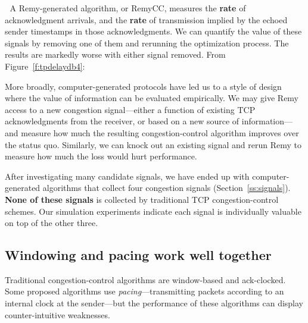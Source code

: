 \vspace{0.85 \baselineskip}
\enlargethispage{\baselineskip}

\noindent \begin{minipage}{\textwidth}

\textcolor{white}{.}\hspace{\parindent} A Remy-generated algorithm, or
RemyCC, measures the \textbf{rate} of acknowledgment arrivals, and the
\textbf{rate} of transmission implied by the echoed sender timestamps
in those acknowledgments. We can quantify the value of these signals
by removing one of them and rerunning the optimization process. The
results are markedly worse with either signal removed.  From
Figure~\ref{f:tpdelaydb4}:

\begin{center}
\def\svgwidth{0.8 \textwidth}\footnotesize
\end{center}
\end{minipage}

\newpage

More broadly, computer-generated protocols have led us to a style
of design where the value of information can be evaluated
empirically. We may give Remy access to a new congestion
signal---either a function of existing TCP acknowledgments from the
receiver, or based on a new source of information---and measure
how much the resulting congestion-control algorithm improves over the
status quo. Similarly, we can knock out an existing signal and rerun
Remy to measure how much the loss would hurt performance.

After investigating many candidate signals, we have ended up with
computer-generated algorithms that collect four congestion signals
(Section~\ref{ss:signals}). \textbf{None of these signals} is
collected by traditional TCP congestion-control schemes. Our
simulation experiments indicate each signal is individually valuable on
top of the other three.

\subsection{Windowing and pacing work well together}

Traditional congestion-control algorithms are window-based and
ack-clocked.~\cite{Srikant} Some proposed algorithms use
\emph{pacing}---transmitting packets according to an internal clock at
the sender---but the performance of these algorithms can display
counter-intuitive weaknesses.~\cite{understandingpacing}

